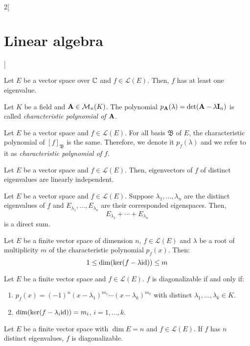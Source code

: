 \documentclass[../../../main.tex]{subfiles}
\begin{document}
\begin{multicols}{2}[\section{Linear algebra}]
\begin{corollary}
\end{corollary}
\begin{corollary}
    Let $E$ be a vector space over $\mathbb{C}$ and $f\in\mathcal{L}(E)$. Then, $f$ has at least one eigenvalue.
\end{corollary}
\begin{definition}
    Let $K$ be a field and $\vb{A}\in\mathcal{M}_n(K)$. The polynomial $p_{\vb{A}}(\lambda)=\det(\vb{A}-\lambda \vb{I}_n)$ is called \textit{characteristic polynomial of $\vb{A}$}.
\end{definition}
\begin{prop}
    Let $E$ be a vector space and $f\in\mathcal{L}(E)$. For all basis $\mathfrak{B}$ of $E$, the characteristic polynomial of $[f]_\mathfrak{B}$ is the same. Therefore, we denote it $p_f(\lambda)$ and we refer to it as \textit{characteristic polynomial of $f$}.
\end{prop}
\begin{prop}
    Let $E$ be a vector space and $f\in\mathcal{L}(E)$. Then, eigenvectors of $f$ of distinct eigenvalues are linearly independent.
\end{prop}
\begin{corollary}
    Let $E$ be a vector space and $f\in\mathcal{L}(E)$. Suppose $\lambda_1,\ldots,\lambda_n$ are the distinct eigenvalues of $f$ and $E_{\lambda_1},\ldots,E_{\lambda_n}$ are their corresponded eigenspaces. Then, $$E_{\lambda_1}+\cdots+E_{\lambda_n}$$ is a direct sum. 
\end{corollary}
\begin{prop}
    Let $E$ be a finite vector space of dimension $n$, $f\in\mathcal{L}(E)$ and $\lambda$ be a root of multiplicity $m$ of the characteristic polynomial $p_f(x)$. Then: $$1\leq \dim(\ker(f-\lambda\mathrm{id}))\leq m$$
\end{prop}
\begin{theorem}
    Let $E$ be a finite vector space and $f\in\mathcal{L}(E)$. $f$ is diagonalizable if and only if:
    \begin{enumerate}
        \item $p_f(x)=(-1)^n(x-\lambda_1)^{m_1}\cdots(x-\lambda_k)^{m_k}$ with distinct $\lambda_1,\ldots,\lambda_k\in K$.
        \item $\dim(\ker(f-\lambda_i \mathrm{id}))=m_i$, $i=1,\ldots,k$.
    \end{enumerate}
\end{theorem}
\begin{corollary}
    Let $E$ be a finite vector space with $\dim E=n$ and $f\in\mathcal{L}(E)$. If $f$ has $n$ distinct eigenvalues, $f$ is diagonalizable.

\end{corollary}
\end{multicols}
\end{document}
